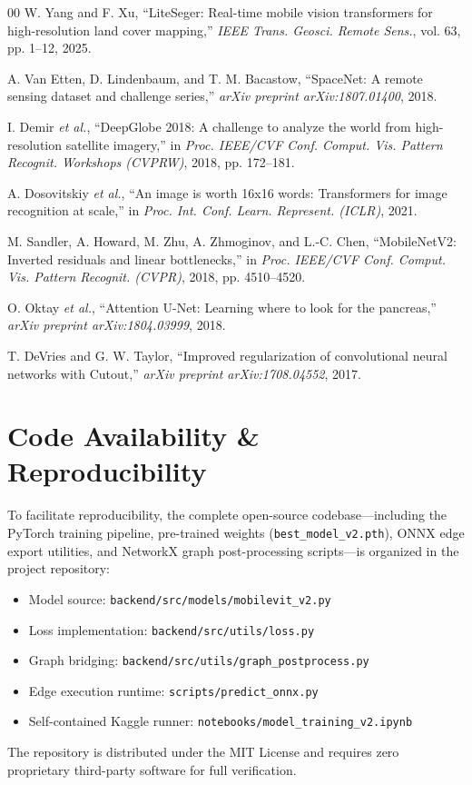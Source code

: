 \documentclass[conference]{IEEEtran}
\begin{document}
\begin{thebibliography}{00}
 W. Yang and F. Xu, ``LiteSeger: Real-time mobile vision transformers for high-resolution land cover mapping,'' \textit{IEEE Trans. Geosci. Remote Sens.}, vol. 63, pp. 1--12, 2025.

 A. Van Etten, D. Lindenbaum, and T. M. Bacastow, ``SpaceNet: A remote sensing dataset and challenge series,'' \textit{arXiv preprint arXiv:1807.01400}, 2018.

 I. Demir \textit{et al.}, ``DeepGlobe 2018: A challenge to analyze the world from high-resolution satellite imagery,'' in \textit{Proc. IEEE/CVF Conf. Comput. Vis. Pattern Recognit. Workshops (CVPRW)}, 2018, pp. 172--181.

 A. Dosovitskiy \textit{et al.}, ``An image is worth 16x16 words: Transformers for image recognition at scale,'' in \textit{Proc. Int. Conf. Learn. Represent. (ICLR)}, 2021.

 M. Sandler, A. Howard, M. Zhu, A. Zhmoginov, and L.-C. Chen, ``MobileNetV2: Inverted residuals and linear bottlenecks,'' in \textit{Proc. IEEE/CVF Conf. Comput. Vis. Pattern Recognit. (CVPR)}, 2018, pp. 4510--4520.

 O. Oktay \textit{et al.}, ``Attention U-Net: Learning where to look for the pancreas,'' \textit{arXiv preprint arXiv:1804.03999}, 2018.

 T. DeVries and G. W. Taylor, ``Improved regularization of convolutional neural networks with Cutout,'' \textit{arXiv preprint arXiv:1708.04552}, 2017.

\end{thebibliography}

\appendices
\section{Code Availability \& Reproducibility}
To facilitate reproducibility, the complete open-source codebase—including the PyTorch training pipeline, pre-trained weights (\texttt{best\_model\_v2.pth}), ONNX edge export utilities, and NetworkX graph post-processing scripts—is organized in the project repository:
\begin{itemize}
    \item Model source: \texttt{backend/src/models/mobilevit\_v2.py}
    \item Loss implementation: \texttt{backend/src/utils/loss.py}
    \item Graph bridging: \texttt{backend/src/utils/graph\_postprocess.py}
    \item Edge execution runtime: \texttt{scripts/predict\_onnx.py}
    \item Self-contained Kaggle runner: \texttt{notebooks/model\_training\_v2.ipynb}
\end{itemize}
The repository is distributed under the MIT License and requires zero proprietary third-party software for full verification.
\end{document}
